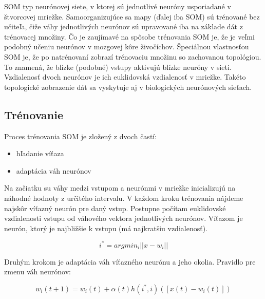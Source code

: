 SOM typ neurónovej siete, v ktorej sú jednotlivé neuróny usporiadané v štvorcovej mriežke. Samoorganizujúce sa mapy (ďalej iba SOM) sú trénované bez učiteľa, čiže váhy jednotlivých neurónov sú upravované iba na základe dát z trénovacej množiny. Čo je zaujímavé na spôsobe trénovania SOM je, že je veľmi podobný učeniu neurónov v mozgovej kôre živočíchov.
Špeciálnou vlastnosťou SOM je, že po natrénovaní zobrazí trénovaciu množinu so zachovanou topológiou. To znamená, že blízke (podobné) vstupy aktivujú blízke neuróny v sieti. Vzdialenosť dvoch neurónov je ich euklidovská vzdialenosť v mriežke. Takéto topologické zobrazenie dát sa vyskytuje aj v biologických neurónových sieťach.

\subsection{Trénovanie}
Proces trénovania SOM je zložený z dvoch častí:
\begin{itemize}
\item hľadanie víťaza
\item adaptácia váh neurónov
\end{itemize}
Na začiatku su váhy medzi vstupom a neurónmi v mriežke inicializujú na náhodné hodnoty z určitého intervalu.
V každom kroku trénovania nájdeme najskôr víťazný neurón pre daný vstup. Postupne počítam euklidovské vzdialenosti vstupu od váhového vektora jednotlivých neurónov. Víťazom je neurón, ktorý je najbližšie k vstupu (má najkratšiu vzdialenosť).

\begin{equation}
i^* = argmin_i||x-w_i|| 
\end{equation}

Druhým krokom je adaptácia váh víťazného neurónu a jeho okolia. Pravidlo pre zmenu váh neurónov:

\begin{equation}
w_i(t+1) = w_i(t) + \alpha(t)h(i^*, i)([x(t) - w_i(t)])
\end{equation}

